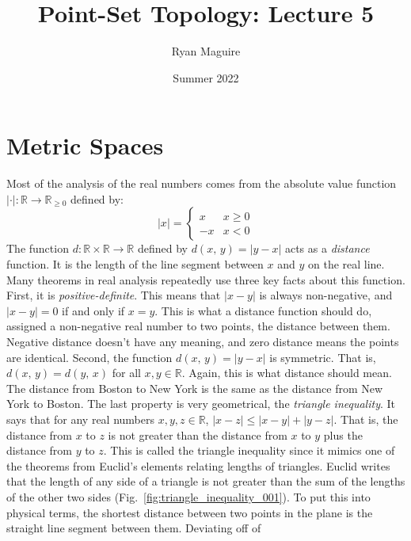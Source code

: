 \documentclass{article}
\title{Point-Set Topology: Lecture 5}
\author{Ryan Maguire}
\date{Summer 2022}
\theoremstyle{plain}
\theoremstyle{normal}
\begin{document}
    \maketitle
    \section{Metric Spaces}
        Most of the analysis of the real numbers comes from the absolute value
        function $|\cdot|:\mathbb{R}\rightarrow\mathbb{R}_{\geq{0}}$ defined
        by:
        \begin{equation}
            |x|=
            \begin{cases}
                x&x\geq{0}\\
                -x&x<0
            \end{cases}
        \end{equation}
        The function $d:\mathbb{R}\times\mathbb{R}\rightarrow\mathbb{R}$
        defined by $d(x,\,y)=|y-x|$ acts as a \textit{distance} function. It is
        the length of the line segment between $x$ and $y$ on the real line.
        Many theorems in real analysis repeatedly use three key facts about this
        function. First, it is \textit{positive-definite}. This means that
        $|x-y|$ is always non-negative, and $|x-y|=0$ if and only if $x=y$.
        This is what a distance function should do, assigned a non-negative
        real number to two points, the distance between them. Negative distance
        doesn't have any meaning, and zero distance means the points are
        identical. Second, the function $d(x,\,y)=|y-x|$ is symmetric. That is,
        $d(x,\,y)=d(y,\,x)$ for all $x,y\in\mathbb{R}$. Again, this is what
        distance should mean. The distance from Boston to New York is the same
        as the distance from New York to Boston. The last property is very
        geometrical, the \textit{triangle inequality}. It says that for any
        real numbers $x,y,z\in\mathbb{R}$, $|x-z|\leq|x-y|+|y-z|$. That is,
        the distance from $x$ to $z$ is not greater than the distance from
        $x$ to $y$ plus the distance from $y$ to $z$. This is called the
        triangle inequality since it mimics one of the theorems from Euclid's
        elements relating lengths of triangles. Euclid writes that the length
        of any side of a triangle is not greater than the sum of the lengths of
        the other two sides (Fig.~\ref{fig:triangle_inequality_001}). To put
        this into physical terms, the shortest distance between two points in
        the plane is the straight line segment between them. Deviating off of
\end{document}
